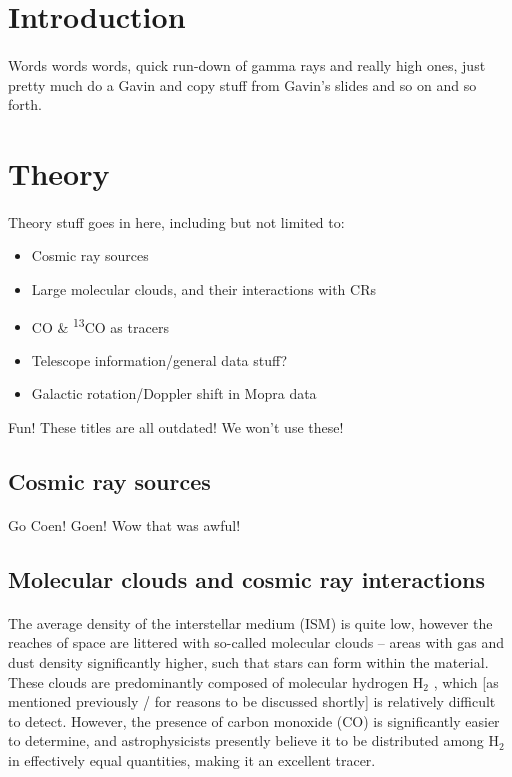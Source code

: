 \documentclass[a4paper, titlepage, oneside]{article}
\newcommand{\elem}[2]{\textsuperscript{#1}{#2}}
\newcommand{\molec}[2]{\ensuremath{\text{#1}_{#2}}}
\begin{document}
\begin{multicols}{2}
\section{Introduction}
\paragraph{}
Words words words, quick run-down of gamma rays and really high ones, just pretty much do a Gavin and copy stuff from Gavin's slides and so on and so forth.

\section{Theory}
\paragraph{}
Theory stuff goes in here, including but not limited to:
\begin{itemize}
  \item Cosmic ray sources
  \item Large molecular clouds, and their interactions with CRs
  \item CO \& \elem{13}{CO} as tracers
  \item Telescope information/general data stuff?
  \item Galactic rotation/Doppler shift in Mopra data
\end{itemize}
Fun! These titles are all outdated! We won't use these!

\subsection{Cosmic ray sources}
\paragraph{}
Go Coen! Goen! Wow that was awful!

\subsection{Molecular clouds and cosmic ray interactions}
\paragraph{}
The average density of the interstellar medium (ISM) is quite low, however the reaches of space are littered with so-called molecular clouds -- areas with gas and dust density significantly higher, such that stars can form within the material. These clouds are predominantly composed of molecular hydrogen \molec{H}{2} , which [as mentioned previously / for reasons to be discussed shortly] is relatively difficult to detect. However, the presence of carbon monoxide (CO) is significantly easier to determine, and astrophysicists presently believe it to be distributed among \molec{H}{2} in effectively equal quantities, making it an excellent tracer.


\end{multicols}
\end{document}
